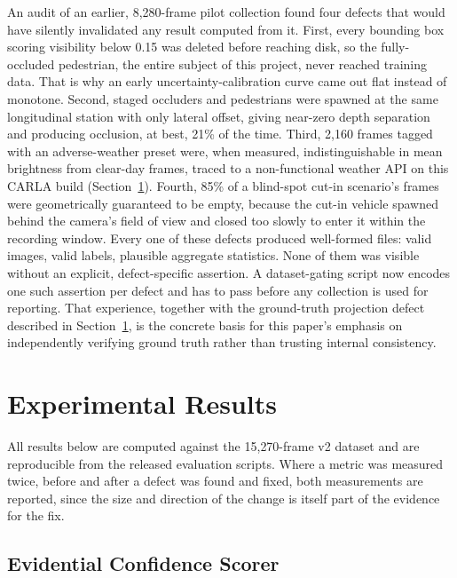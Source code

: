 \documentclass[conference]{IEEEtran}
\begin{document}
An audit of an earlier, 8{,}280-frame pilot collection found four
defects that would have silently invalidated any result computed from
it. First, every bounding box scoring visibility below
0.15 was deleted before reaching disk, so the fully-occluded pedestrian,
the entire subject of this project, never reached training data. That
is why an early uncertainty-calibration curve came out flat instead of
monotone. Second, staged occluders and pedestrians were spawned at the
same longitudinal station with only lateral offset, giving near-zero
depth separation and producing occlusion, at best, 21\% of the time.
Third, 2{,}160 frames tagged with an adverse-weather preset were, when
measured, indistinguishable in mean brightness from clear-day frames,
traced to a non-functional weather API on this CARLA
build (Section~\ref{sec:results}). Fourth, 85\% of a blind-spot cut-in
scenario's frames were geometrically guaranteed to be empty, because
the cut-in vehicle spawned behind the camera's field of view and closed
too slowly to enter it within the recording window. Every one of these
defects produced well-formed files: valid images, valid labels,
plausible aggregate statistics. None of them was visible without an
explicit, defect-specific assertion. A dataset-gating script now
encodes one such assertion per defect and has to pass before any
collection is used for reporting. That experience, together with the
ground-truth projection defect described in Section~\ref{sec:results},
is the concrete basis for this paper's emphasis on independently
verifying ground truth rather than trusting internal consistency.

\section{Experimental Results}
\label{sec:results}

All results below are computed against the 15{,}270-frame v2 dataset
and are reproducible from the released evaluation scripts. Where a
metric was measured twice, before and after a defect was found and
fixed, both measurements are reported, since the size and direction of
the change is itself part of the evidence for the fix.

\subsection{Evidential Confidence Scorer}
\end{document}
